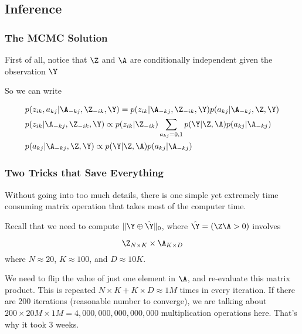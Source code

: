 \documentclass{beamer}
\begin{document}
\subsection{Inference}
\begin{frame}
\frametitle{The MCMC Solution}
First of all, notice that $\Z$ and $\A$ are conditionally independent given the observation $\Y$

\begin{figure}[h]
\centering
{}
\end{figure}

So we can write

\fontsize{8pt}{7.2}\selectfont
\begin{align}	
	&p(z_{ik}, a_{kj}|\A_{-kj},\Z_{-ik},\Y) = p(z_{ik}|\A_{-kj},\Z_{-ik},\Y) p(a_{kj}|\A_{-kj},\Z,\Y) \\
	&p(z_{ik}|\A_{-kj},\Z_{-ik},\Y) \propto p(z_{ik}|\Z_{-ik}) \sum_{a_{kj}={0,1}} p(\Y|\Z, \A) p(a_{kj}|\A_{-kj}) \\
	&p(a_{kj}|\A_{-kj},\Z,\Y) \propto p(\Y|\Z, \A) p(a_{kj}|\A_{-kj})
\end{align}

\end{frame}

\begin{frame}
\frametitle{Two Tricks that Save Everything}
Without going into too much details, there is one simple yet extremely time consuming matrix operation that takes most of the computer time.

\vspace{0.1in}
Recall that we need to compute $\|\Y \oplus \hat\Y\|_0$, where $\hat\Y = (\Z\A > 0)$ involves

$$\Z_{N \times K} \times \A_{K \times D}$$ where $N \approx 20$, $K \approx 100$, and $D \approx 10K$.

\vspace{0.1in}
\fontsize{8pt}{7.2}\selectfont
We need to flip the value of just one element in $\A$, and re-evaluate this matrix product. This is repeated $N \times K + K \times D \approx 1M$ times in every iteration. If there are 200 iterations (reasonable number to converge), we are talking about $200 \times 20M \times 1M = 4,000,000,000,000,000$ multiplication operations here. That's why it took 3 weeks.


\end{frame}
\end{document}
